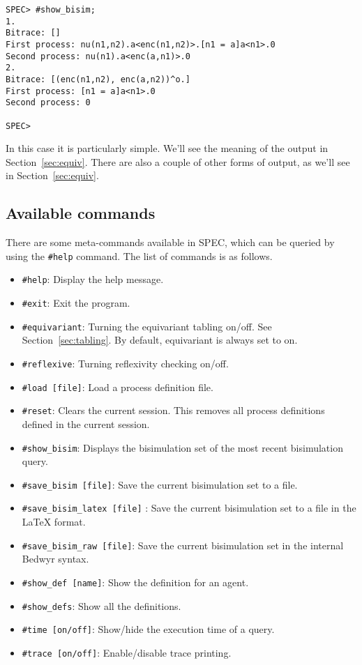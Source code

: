 \documentclass{article}
\newcommand\obj[1]{\texttt{#1}}
\begin{document}
\begin{verbatim}
SPEC> #show_bisim;
1. 
Bitrace: []
First process: nu(n1,n2).a<enc(n1,n2)>.[n1 = a]a<n1>.0
Second process: nu(n1).a<enc(a,n1)>.0
2. 
Bitrace: [(enc(n1,n2), enc(a,n2))^o.]
First process: [n1 = a]a<n1>.0
Second process: 0

SPEC> 
\end{verbatim}

In this case it is particularly simple. 
We'll see the meaning of the output in Section~\ref{sec:equiv}. 
There are also a couple of other forms of output, as we'll see in Section~\ref{sec:equiv}. 

\subsection{Available commands}

There are some meta-commands available in SPEC, which can be queried by 
using the \texttt{\#help} command. The list of commands is as follows. 
\begin{itemize}
\item \obj{\#help}: Display the help message.
\item \obj{\#exit}: Exit the program. 
\item \obj{\#equivariant}: Turning the equivariant tabling on/off. See Section~\ref{sec:tabling}.
By default, equivariant is always set to on.
\item \obj{\#reflexive}: Turning reflexivity checking on/off. 
\item \obj{\#load [file]}: Load a process definition file.
\item \obj{\#reset}: Clears the current session. This removes all process definitions defined
in the current session. 
\item \obj{\#show\_bisim}: Displays the bisimulation set of the most recent 
bisimulation query. 
\item \obj{\#save\_bisim [file]}: Save the current bisimulation set to a file. 
\item \obj{\#save\_bisim\_latex [file]} : Save the current bisimulation set to 
                          a file in the LaTeX format. 
\item \obj{\#save\_bisim\_raw [file]}:   Save the current bisimulation set in 
                          the internal Bedwyr syntax. 
\item \obj{\#show\_def [name]}:          Show the definition for an agent. 
\item \obj{\#show\_defs}:               Show all the definitions. 
\item \obj{\#time [on/off]}:            Show/hide the execution time of a query.
\item \obj{\#trace [on/off]}: Enable/disable trace printing.
\end{itemize}
\end{document}
